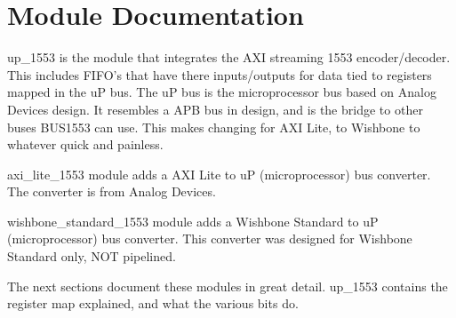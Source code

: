 \newpage

\section{Module Documentation} \label{Module Documentation}

\par
up\_1553 is the module that integrates the AXI streaming 1553 encoder/decoder.
This includes FIFO's that have there inputs/outputs for data tied to registers mapped in the uP bus.
The uP bus is the microprocessor bus based on Analog Devices design. It resembles a APB bus in design,
and is the bridge to other buses BUS1553 can use. This makes changing for AXI Lite, to Wishbone to whatever
quick and painless.

\par
axi\_lite\_1553 module adds a AXI Lite to uP (microprocessor) bus converter. The converter is
from Analog Devices.

\par
wishbone\_standard\_1553 module adds a Wishbone Standard to uP (microprocessor) bus converter. This
converter was designed for Wishbone Standard only, NOT pipelined.

\vspace{15mm}
\par
The next sections document these modules in great detail. up\_1553 contains the register map explained, and what the various bits do.

